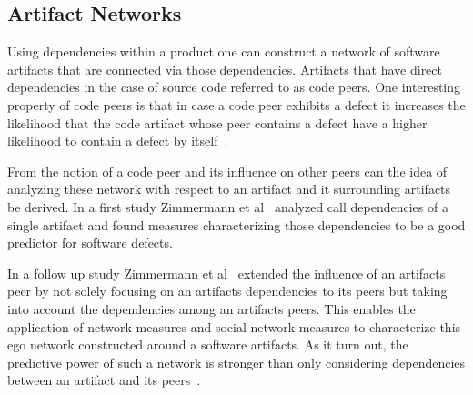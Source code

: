 %


\subsection{Artifact Networks}
\label{chap:6:an}
Using dependencies within a product one can construct a network of software artifacts that are connected via those dependencies.
Artifacts that have direct dependencies in the case of source code referred to as code peers.
One interesting property of code peers is that in case a code peer exhibits a defect it increases the likelihood that the code artifact whose peer contains a defect have a higher likelihood to contain a defect by itself~\cite{nguyen:icse:2010}.

From the notion of a code peer and its influence on other peers can the idea of analyzing these network with respect to an artifact and it surrounding artifacts be derived.
In a first study Zimmermann et al~\cite{zimmermann:icse:2008} analyzed call dependencies of a single artifact and found measures characterizing those dependencies to be a good predictor for software defects.

In a follow up study Zimmermann et al~\cite{zimmermann:esem:2009} extended the influence of an artifacts peer by not solely focusing on an artifacts dependencies to its peers but taking into account the dependencies among an artifacts peers.
This enables the application of network measures and social-network measures to characterize this ego network constructed around a software artifacts.
As it turn out, the predictive power of such a network is stronger than only considering dependencies between an artifact and its peers~\cite{zimmermann:esem:2009}.


